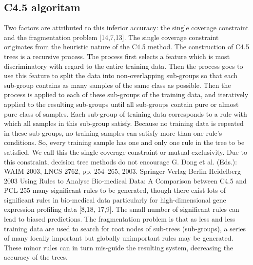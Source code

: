 \subsection{C4.5 algoritam}


Two factors are attributed
to this inferior accuracy: the single coverage constraint and the fragmentation problem
[14,7,13].
The single coverage constraint originates from the heuristic nature of the C4.5
method. The construction of C4.5 trees is a recursive process. The process first selects
a feature which is most discriminatory with regard to the entire training data. Then
the process goes to use this feature to split the data into non-overlapping sub-groups
so that each sub-group contains as many samples of the same class as possible. Then
the process is applied to each of these sub-groups of the training data, and iteratively
applied to the resulting sub-groups until all sub-groups contain pure or almost pure class
of samples.
Each sub-group of training data corresponds to a rule with which all samples in this
sub-group satisfy. Because no training data is repeated in these sub-groups, no training
samples can satisfy more than one rule’s conditions. So, every training sample has one
and only one rule in the tree to be satisfied. We call this the single coverage constraint
or mutual exclusivity. Due to this constraint, decision tree methods do not encourage
G. Dong et al. (Eds.): WAIM 2003, LNCS 2762, pp. 254–265, 2003. Springer-Verlag Berlin Heidelberg 2003
Using Rules to Analyse Bio-medical Data: A Comparison between C4.5 and PCL 255
many significant rules to be generated, though there exist lots of significant rules in
bio-medical data particularly for high-dimensional gene expression profiling data [8,18,
17,9]. The small number of significant rules can lead to biased predictions.
The fragmentation problem is that as less and less training data are used to search for
root nodes of sub-trees (sub-groups), a series of many locally important but globally unimportant
rules may be generated. These minor rules can in turn mis-guide the resulting
system, decreasing the accuracy of the trees.
